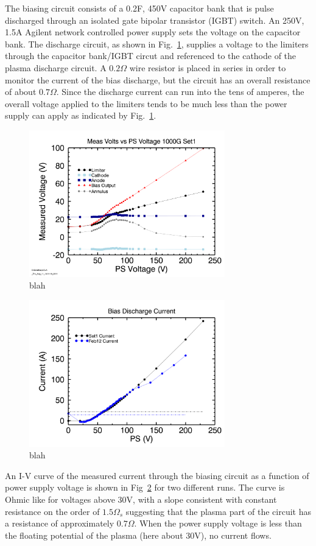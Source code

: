 \documentclass[aip,pop,amsmath,amssymb,preprint,superscriptaddress]{revtex4-1} %
\begin{document}
The biasing circuit consists of a 0.2F, 450V capacitor bank that is pulse discharged through an isolated gate bipolar transistor (IGBT) switch. An 250V, 1.5A Agilent network controlled power supply sets the voltage on the capacitor bank. The discharge circuit, as shown in Fig.~\ref{fig:VbyBias}, supplies a voltage to the limiters through the capacitor bank/IGBT circut and referenced to the cathode of the plasma discharge circuit. A $0.2 \Omega$ wire resistor is placed in series in order to monitor the current of the bias discharge, but the circuit has an overall resistance of about $0.7 \Omega$. Since the discharge current can run into the tens of amperes, the overall voltage applied to the limiters tends to be much less than the power supply can apply as indicated by Fig.~\ref{fig:VbyBias}. 

\begin{figure}[!htbp]
\centerline{
\includegraphics[width=8.5cm]{VbyBias}}
\caption{\label{fig:VbyBias} blah}
\end{figure}

\begin{figure}[!htbp]
\centerline{
\includegraphics[width=8.5cm]{IV_curves}}
\caption{\label{fig:IV_curves} blah}
\end{figure}

An I-V curve of the measured current through the biasing circuit as a function of power supply voltage is shown in Fig~\ref{fig:IV_curves} for two different runs. The curve is Ohmic like for voltages above 30V, with a slope consistent with constant resistance on the order of $1.5\Omega_{s}$ suggesting that the plasma part of the circuit has a resistance of approximately $0.7\Omega$. When the power supply voltage is less than the floating potential of the plasma (here about 30V), no current flows.
\end{document}
